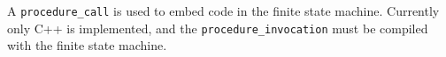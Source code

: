 A {\tt procedure\_call} is used to embed code in the finite state machine.
Currently only C++ is implemented, and the {\tt procedure\_invocation} must
be compiled with the finite state machine.